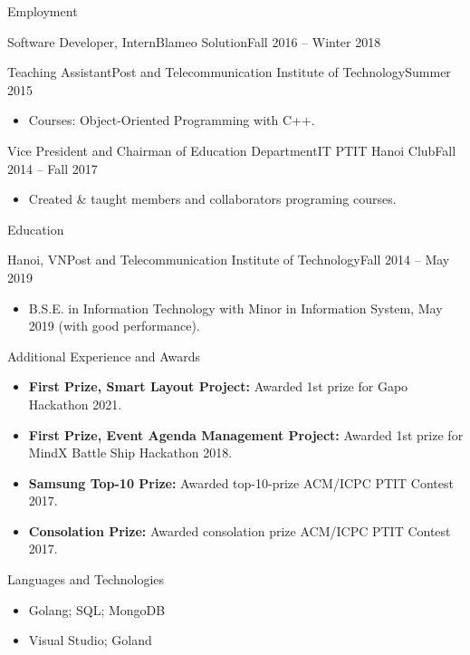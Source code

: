 \documentclass[]{mcdowellcv}
\begin{document}
\begin{cvsection}{Employment}
\begin{cvsubsection}{Software Developer, Intern}{Blameo Solution}{Fall 2016 -- Winter 2018}
\begin{itemize}
			\end{itemize}
		\end{cvsubsection}

		\begin{cvsubsection}{Teaching Assistant}{Post and Telecommunication Institute of Technology}{Summer 2015}		
			\begin{itemize}
				\item Courses: Object-Oriented Programming with C++.
			\end{itemize}
		\end{cvsubsection}

		\begin{cvsubsection}{Vice President and Chairman of Education Department}{IT PTIT Hanoi Club}{Fall 2014 -- Fall 2017}		
			\begin{itemize}
				\item Created \& taught members and collaborators programing courses.
			\end{itemize}
		\end{cvsubsection}
	\end{cvsection}
	
	\begin{cvsection}{Education}
		\begin{cvsubsection}{Hanoi, VN}{Post and Telecommunication Institute of Technology}{Fall 2014 -- May 2019}
			\begin{itemize}
				\item B.S.E. in Information Technology with Minor in Information System, May 2019 (with good performance).
			\end{itemize}
		\end{cvsubsection}
	\end{cvsection}
	
	\begin{cvsection}{Additional Experience and Awards}
		\begin{cvsubsection}{}{}{}	
			\begin{itemize}
				\item \textbf{First Prize, Smart Layout Project:} Awarded 1st prize for Gapo Hackathon 2021.
				\item \textbf{First Prize, Event Agenda Management Project:} Awarded 1st prize for MindX Battle Ship Hackathon 2018.
				\item \textbf{Samsung Top-10 Prize:} Awarded top-10-prize ACM/ICPC PTIT Contest 2017.
				\item \textbf{Consolation Prize:} Awarded consolation prize ACM/ICPC PTIT Contest 2017.
			\end{itemize}
		\end{cvsubsection}
	\end{cvsection}
	
	\begin{cvsection}{Languages and Technologies}
		\begin{cvsubsection}{}{}{}	
			\begin{itemize}
				\item Golang; SQL; MongoDB
				\item Visual Studio; Goland
			\end{itemize}
		\end{cvsubsection}
	\end{cvsection}
	
\end{document}
